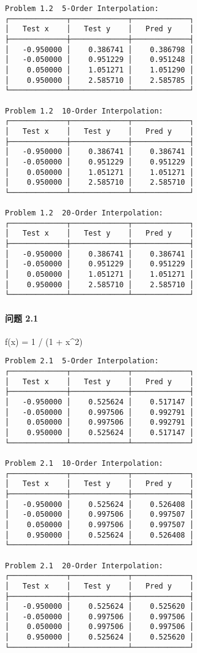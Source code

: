 \documentclass[11pt]{article}
\begin{document}
\begin{verbatim}
Problem 1.2  5-Order Interpolation:
┌─────────────┬─────────────┬─────────────┐
│   Test x    │   Test y    │   Pred y    │
├─────────────┼─────────────┼─────────────┤
│   -0.950000 │    0.386741 │    0.386798 │
│   -0.050000 │    0.951229 │    0.951248 │
│    0.050000 │    1.051271 │    1.051290 │
│    0.950000 │    2.585710 │    2.585785 │
└─────────────┴─────────────┴─────────────┘

Problem 1.2  10-Order Interpolation:
┌─────────────┬─────────────┬─────────────┐
│   Test x    │   Test y    │   Pred y    │
├─────────────┼─────────────┼─────────────┤
│   -0.950000 │    0.386741 │    0.386741 │
│   -0.050000 │    0.951229 │    0.951229 │
│    0.050000 │    1.051271 │    1.051271 │
│    0.950000 │    2.585710 │    2.585710 │
└─────────────┴─────────────┴─────────────┘

Problem 1.2  20-Order Interpolation:
┌─────────────┬─────────────┬─────────────┐
│   Test x    │   Test y    │   Pred y    │
├─────────────┼─────────────┼─────────────┤
│   -0.950000 │    0.386741 │    0.386741 │
│   -0.050000 │    0.951229 │    0.951229 │
│    0.050000 │    1.051271 │    1.051271 │
│    0.950000 │    2.585710 │    2.585710 │
└─────────────┴─────────────┴─────────────┘
\end{verbatim}

    \hypertarget{ux95eeux9898-2.1}{%
\paragraph{问题 2.1}\label{ux95eeux9898-2.1}}

    f(x) = 1 / (1 + x\^{}2)

\begin{verbatim}
Problem 2.1  5-Order Interpolation:
┌─────────────┬─────────────┬─────────────┐
│   Test x    │   Test y    │   Pred y    │
├─────────────┼─────────────┼─────────────┤
│   -0.950000 │    0.525624 │    0.517147 │
│   -0.050000 │    0.997506 │    0.992791 │
│    0.050000 │    0.997506 │    0.992791 │
│    0.950000 │    0.525624 │    0.517147 │
└─────────────┴─────────────┴─────────────┘

Problem 2.1  10-Order Interpolation:
┌─────────────┬─────────────┬─────────────┐
│   Test x    │   Test y    │   Pred y    │
├─────────────┼─────────────┼─────────────┤
│   -0.950000 │    0.525624 │    0.526408 │
│   -0.050000 │    0.997506 │    0.997507 │
│    0.050000 │    0.997506 │    0.997507 │
│    0.950000 │    0.525624 │    0.526408 │
└─────────────┴─────────────┴─────────────┘

Problem 2.1  20-Order Interpolation:
┌─────────────┬─────────────┬─────────────┐
│   Test x    │   Test y    │   Pred y    │
├─────────────┼─────────────┼─────────────┤
│   -0.950000 │    0.525624 │    0.525620 │
│   -0.050000 │    0.997506 │    0.997506 │
│    0.050000 │    0.997506 │    0.997506 │
│    0.950000 │    0.525624 │    0.525620 │
└─────────────┴─────────────┴─────────────┘
\end{verbatim}
\end{document}
